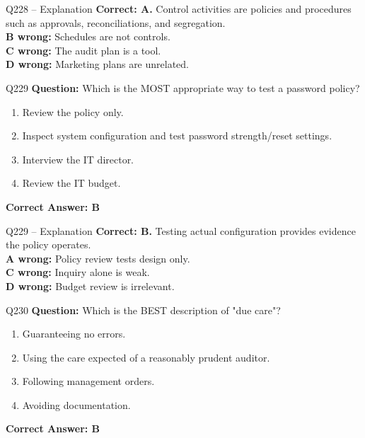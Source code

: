 \documentclass[aspectratio=169,10pt]{beamer}
\begin{document}
	\begin{frame}[t]{Q228 -- Explanation}
		\small
		\textbf{Correct: A.} Control activities are policies and procedures such as approvals, reconciliations, and segregation. \\[4pt]
		\textbf{B wrong:} Schedules are not controls. \\[2pt]
		\textbf{C wrong:} The audit plan is a tool. \\[2pt]
		\textbf{D wrong:} Marketing plans are unrelated.
	\end{frame}
	
	\begin{frame}[t]{Q229}
		\small
		\textbf{Question:} Which is the MOST appropriate way to test a password policy?
		\begin{enumerate}[label=\Alph*.,itemsep=1pt,topsep=2pt]
			\item Review the policy only.
			\item Inspect system configuration and test password strength/reset settings.
			\item Interview the IT director.
			\item Review the IT budget.
		\end{enumerate}
		\vspace{4pt}
		\textbf{Correct Answer: B}
	\end{frame}
	
	\begin{frame}[t]{Q229 -- Explanation}
		\small
		\textbf{Correct: B.} Testing actual configuration provides evidence the policy operates. \\[4pt]
		\textbf{A wrong:} Policy review tests design only. \\[2pt]
		\textbf{C wrong:} Inquiry alone is weak. \\[2pt]
		\textbf{D wrong:} Budget review is irrelevant.
	\end{frame}
	
	\begin{frame}[t]{Q230}
		\small
		\textbf{Question:} Which is the BEST description of "due care"?
		\begin{enumerate}[label=\Alph*.,itemsep=1pt,topsep=2pt]
			\item Guaranteeing no errors.
			\item Using the care expected of a reasonably prudent auditor.
			\item Following management orders.
			\item Avoiding documentation.
		\end{enumerate}
		\vspace{4pt}
		\textbf{Correct Answer: B}
	\end{frame}
	
\end{document}
